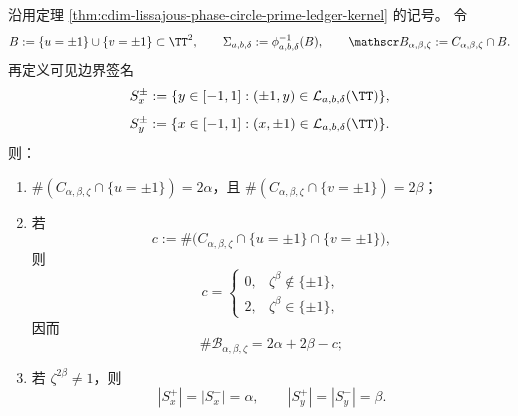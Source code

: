 \begin{theorem}\label{thm:cdim-lissajous-branch-divisor-boundary-signature}
沿用定理 \ref{thm:cdim-lissajous-phase-circle-prime-ledger-kernel} 的记号。
令
\[
B:=\{u=\pm1\}\cup\{v=\pm1\}\subset\TT^2,
\qquad
\Sigma_{a,b,\delta}:=\phi_{a,b,\delta}^{-1}(B),
\qquad
\mathscr B_{\alpha,\beta,\zeta}:=C_{\alpha,\beta,\zeta}\cap B.
\]
再定义可见边界签名
\[
S_x^\pm:=\{y\in[-1,1]:(\pm1,y)\in \mathcal L_{a,b,\delta}(\TT)\},
\]
\[
S_y^\pm:=\{x\in[-1,1]:(x,\pm1)\in \mathcal L_{a,b,\delta}(\TT)\}.
\]
则：
\begin{enumerate}
  \item \(\#(C_{\alpha,\beta,\zeta}\cap\{u=\pm1\})=2\alpha\)，且 \(\#(C_{\alpha,\beta,\zeta}\cap\{v=\pm1\})=2\beta\)；
  \item 若
  \[
  c:=\#\bigl(C_{\alpha,\beta,\zeta}\cap\{u=\pm1\}\cap\{v=\pm1\}\bigr),
  \]
  则
  \[
  c=
  \begin{cases}
  0,& \zeta^\beta\notin\{\pm1\},\\
  2,& \zeta^\beta\in\{\pm1\},
  \end{cases}
  \]
  因而
  \[
  \#\mathscr B_{\alpha,\beta,\zeta}=2\alpha+2\beta-c;
  \]
  \item 若 \(\zeta^{2\beta}\neq 1\)，则
  \[
  |S_x^+|=|S_x^-|=\alpha,\qquad |S_y^+|=|S_y^-|=\beta.
  \]
\end{enumerate}
\end{theorem}

